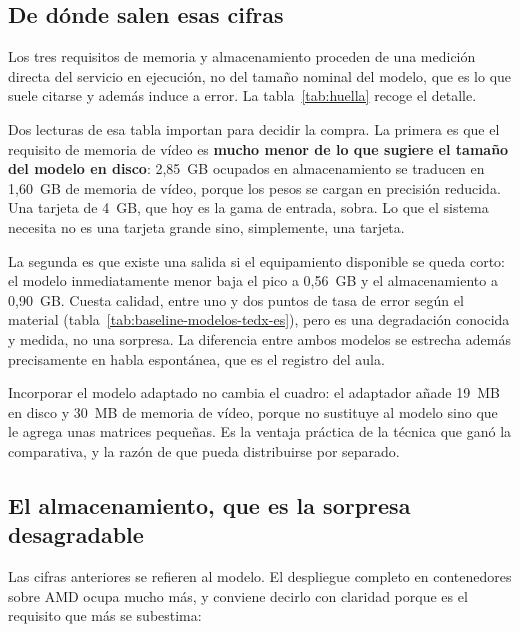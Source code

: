 \subsection*{De dónde salen esas cifras}

Los tres requisitos de memoria y almacenamiento proceden de una medición directa del
servicio en ejecución, no del tamaño nominal del modelo, que es lo que suele citarse y
además induce a error. La tabla~\ref{tab:huella} recoge el detalle.



Dos lecturas de esa tabla importan para decidir la compra. La primera es que el requisito de
memoria de vídeo es \textbf{mucho menor de lo que sugiere el tamaño del modelo en disco}:
2,85~GB ocupados en almacenamiento se traducen en 1,60~GB de memoria de vídeo, porque los
pesos se cargan en precisión reducida. Una tarjeta de 4~GB, que hoy es la gama de entrada,
sobra. Lo que el sistema necesita no es una tarjeta grande sino, simplemente, una tarjeta.

La segunda es que existe una salida si el equipamiento disponible se queda corto: el modelo
inmediatamente menor baja el pico a 0,56~GB y el almacenamiento a 0,90~GB. Cuesta calidad,
entre uno y dos puntos de tasa de error según el material
(tabla~\ref{tab:baseline-modelos-tedx-es}), pero es una degradación conocida y medida, no una
sorpresa. La diferencia entre ambos modelos se estrecha además precisamente en habla
espontánea, que es el registro del aula.

Incorporar el modelo adaptado no cambia el cuadro: el adaptador añade 19~MB en disco y
30~MB de memoria de vídeo, porque no sustituye al modelo sino que le agrega unas matrices
pequeñas. Es la ventaja práctica de la técnica que ganó la comparativa, y la razón de que
pueda distribuirse por separado.

\subsection*{El almacenamiento, que es la sorpresa desagradable}

Las cifras anteriores se refieren al modelo. El despliegue completo en contenedores sobre
AMD ocupa mucho más, y conviene decirlo con claridad porque es el requisito que más se
subestima:

